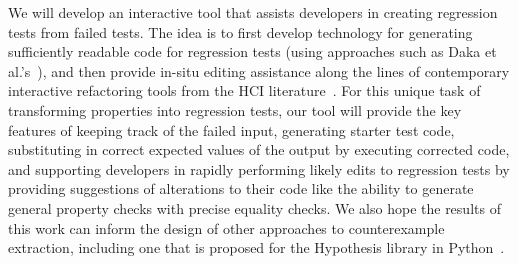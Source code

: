 We will develop an interactive tool that assists developers in creating
regression tests from failed tests. The idea is to first develop
technology for generating sufficiently readable code for regression tests (using
approaches such as Daka et al.'s~\cite{ref:daka2015modeling}), and then provide
in-situ editing assistance along the lines of contemporary interactive
refactoring tools from the HCI
literature~\cite{ref:head2018interactive,ref:barik2016quick,ref:murphyhill2008refactoring,ref:lee2013draganddrop}.
For this unique task of transforming properties into regression tests,
our tool will provide the key features of keeping track of the failed input,
generating starter test code, substituting in correct expected values of the
output by executing corrected code, and supporting developers in rapidly
performing likely edits to regression tests by providing suggestions of
alterations to their code like the ability to generate general property checks
with precise equality checks. We also hope the results of this work
can inform the
design of other approaches to counterexample extraction, including one that is
proposed for the Hypothesis library in Python~\cite{maciver2019hypothesis}.



